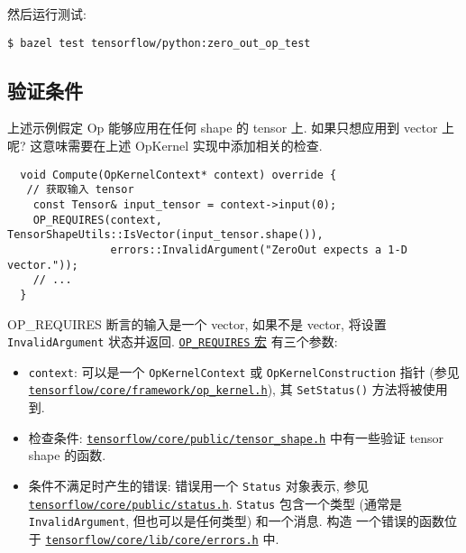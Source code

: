 然后运行测试:

\begin{verbatim}
$ bazel test tensorflow/python:zero_out_op_test
\end{verbatim}

\subsection{验证条件 }\label{ux9a8cux8bc1ux6761ux4ef6}

上述示例假定 Op 能够应用在任何 shape 的 tensor 上. 如果只想应用到 vector
上 呢? 这意味需要在上述 OpKernel 实现中添加相关的检查.

\begin{verbatim}
  void Compute(OpKernelContext* context) override {
   // 获取输入 tensor
    const Tensor& input_tensor = context->input(0);
    OP_REQUIRES(context, TensorShapeUtils::IsVector(input_tensor.shape()),
                errors::InvalidArgument("ZeroOut expects a 1-D vector."));
    // ...
  }
\end{verbatim}

OP\_REQUIRES 断言的输入是一个 vector, 如果不是 vector, 将设置
\texttt{InvalidArgument} 状态并返回.
\href{https://tensorflow.googlesource.com/tensorflow/+/master/tensorflow/core/lib/core/errors.h}{\texttt{OP\_REQUIRES}
宏} 有三个参数:

\begin{itemize}
\tightlist
\item
  \texttt{context}: 可以是一个 \texttt{OpKernelContext} 或
  \texttt{OpKernelConstruction} 指针 (参见
  \href{https://tensorflow.googlesource.com/tensorflow/+/master/tensorflow/core/framework/op_kernel.h}{\texttt{tensorflow/core/framework/op\_kernel.h}}),
  其 \texttt{SetStatus()} 方法将被使用到.
\item
  检查条件:
  \href{https://tensorflow.googlesource.com/tensorflow/+/master/tensorflow/core/public/tensor_shape.h}{\texttt{tensorflow/core/public/tensor\_shape.h}}
  中有一些验证 tensor shape 的函数.
\item
  条件不满足时产生的错误: 错误用一个 \texttt{Status} 对象表示, 参见
  \href{https://tensorflow.googlesource.com/tensorflow/+/master/tensorflow/core/public/status.h}{\texttt{tensorflow/core/public/status.h}}.
  \texttt{Status} 包含一个类型 (通常是 \texttt{InvalidArgument},
  但也可以是任何类型) 和一个消息. 构造 一个错误的函数位于
  \href{https://tensorflow.googlesource.com/tensorflow/+/master/tensorflow/core/lib/core/errors.h}{\texttt{tensorflow/core/lib/core/errors.h}}
  中.
\end{itemize}

